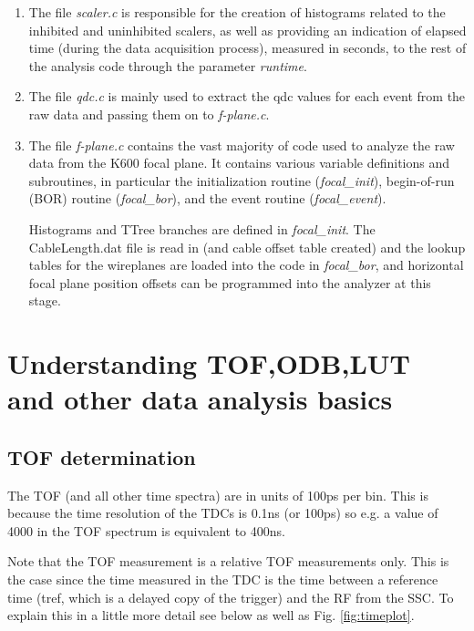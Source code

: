 \documentclass[11pt]{report}
\begin{document}
\begin{enumerate}

\item The file {\it scaler.c} is responsible for the creation of histograms
related to the inhibited and uninhibited scalers, as well as providing an indication
of elapsed time (during the data acquisition process), measured in seconds,
to the rest of the analysis code through the parameter {\it runtime}.

\item The file {\it qdc.c} is mainly used to extract the qdc values for each event
from the raw data and passing them on to {\it f-plane.c}.

\item The file {\it f-plane.c} contains the vast majority of code used to analyze
the raw data from the K600 focal plane.
It contains various variable definitions and subroutines, in particular the
initialization routine ({\it focal\_init}),
begin-of-run (BOR) routine ({\it focal\_bor}), 
and  
the event routine ({\it focal\_event}).

Histograms and TTree branches are defined in {\it focal\_init}.
The CableLength.dat file is read in (and cable offset table created)
and the lookup tables for the wireplanes are loaded into the code
in {\it focal\_bor}, and horizontal focal plane position offsets can
be programmed into the analyzer at this stage.


\end{enumerate}

\section{Understanding TOF,ODB,LUT and other data analysis basics}

\subsection{TOF determination}

The TOF (and all other time spectra) are in units of 100ps per bin.
This is because the time resolution of the TDCs is 0.1ns (or 100ps) so
e.g. a value of 4000 in the TOF spectrum is equivalent to 400ns.

Note that the TOF measurement is a relative TOF measurements only.
This is the case since the time measured in the TDC is the time between
a reference time (tref, which is a delayed copy of the trigger) and the RF from the SSC.
To explain this in a little more detail see below as well as Fig. \ref{fig:timeplot}.
\end{document}

